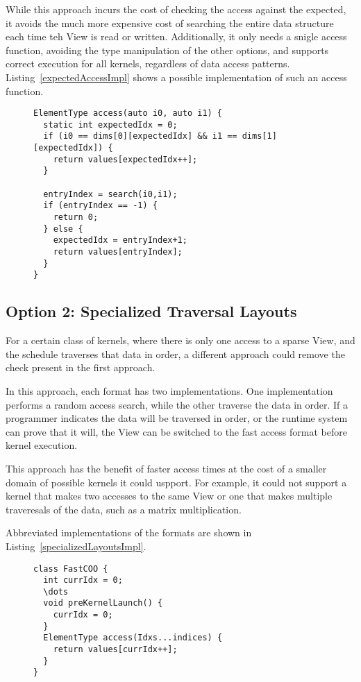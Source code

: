 While this approach incurs the cost of checking the access against the expected, it avoids the much more expensive cost of searching the entire data structure each time teh View is read or written.
Additionally, it only needs a snigle access function, avoiding the type manipulation of the other options, and supports correct execution for all kernels, regardless of data access patterns.
Listing~\ref{expectedAccessImpl} shows a possible implementation of such an access function.
\begin{figure}
\begin{lstlisting}[caption={Possible implementation fo the Expected Next Access approach to efficient data traversal.},label=expectedAccessImpl]
ElementType access(auto i0, auto i1) {
  static int expectedIdx = 0;
  if (i0 == dims[0][expectedIdx] && i1 == dims[1][expectedIdx]) {
    return values[expectedIdx++];
  }
  
  entryIndex = search(i0,i1);
  if (entryIndex == -1) {
    return 0;
  } else {
    expectedIdx = entryIndex+1;
    return values[entryIndex];
  }
}
\end{lstlisting}
\end{figure}

\subsection{Option 2: Specialized Traversal Layouts}
For a certain class of kernels, where there is only one access to a sparse View, and the schedule traverses that data in order, a different approach could remove the check present in the first approach.

In this approach, each format has two implementations. 
One implementation performs a random access search, while the other traverse the data in order. 
If a programmer indicates the data will be traversed in order, or the runtime system can prove that it will, the View can be switched to the fast access format before kernel execution.

This approach has the benefit of faster access times at the cost of a smaller domain of possible kernels it could uspport. 
For example, it could not support a kernel that makes two accesses to the same View or one that makes multiple traveresals of the data, such as a matrix multiplication.

Abbreviated implementations of the formats are shown in Listing~\ref{specializedLayoutsImpl}.
\begin{figure}
\begin{lstlisting}[caption={Abbreviated format implementation for the Specialized Traversal Layout approach.},label=specializedLayoutsImpl]
class FastCOO {
  int currIdx = 0;
  \dots
  void preKernelLaunch() {
    currIdx = 0;
  }
  ElementType access(Idxs...indices) {
    return values[currIdx++];
  }
}
\end{lstlisting}
\end{figure}

